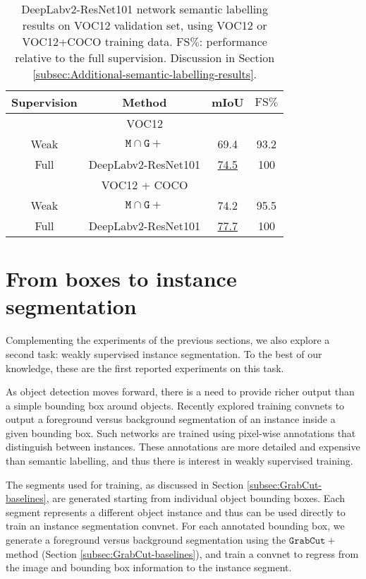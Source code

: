 \documentclass[10pt,english,british,twocolumn]{article}
\providecommand{\tabularnewline}{\\}
\begin{document}
\begin{table}
\begin{centering}
\begin{tabular}{c|c|cc}
Supervision & Method & mIoU & $\text{FS}\%$\tabularnewline
\hline 
\hline 
\multicolumn{4}{c}{\cellcolor{verylightgray}VOC12}\tabularnewline
\multirow{1}{*}{Weak} & $\mathtt{M}\cap\mathtt{G+}$ & 69.4 & 93.2\tabularnewline
Full & DeepLabv2-ResNet101 \cite{Chen2016ArxivDeeplabv2} & \uline{74.5} & 100\tabularnewline
\hline 
\hline 
\multicolumn{4}{c}{\cellcolor{verylightgray}VOC12 + COCO}\tabularnewline
\multirow{1}{*}{Weak} & $\mathtt{M}\cap\mathtt{G+}$ & 74.2 & 95.5\tabularnewline
\multirow{1}{*}{Full} & DeepLabv2-ResNet101 \cite{Chen2016ArxivDeeplabv2} & \uline{77.7} & 100\tabularnewline
\end{tabular}\vspace{-0.5em}
\par\end{centering}
\caption{\label{tab:Semantic-labelling-results-ResNet}Deep\-Lab\-v2-ResNet101
network semantic labelling results on VOC12 validation set, using
VOC12 or VOC12+COCO training data. $\text{FS}\%$: performance relative
to the full supervision. Discussion in Section \ref{subsec:Additional-semantic-labelling-results}.}

\vspace{-1em}
\end{table}


\section{\label{sec:Instance-segmentation}From boxes to instance segmentation}

Complementing the experiments of the previous sections, we also explore
a second task: weakly supervised instance segmentation. To the best
of our knowledge, these are the first reported experiments on this
task. 

As object detection moves forward, there is a need to provide richer
output than a simple bounding box around objects. Recently \cite{Hariharan2015Cvpr,Pinheiro2015Nips,Pinheiro2016Eccv}
explored training convnets to output a foreground versus background
segmentation of an instance inside a given bounding box. Such networks
are trained using pixel-wise annotations that distinguish between
instances. These annotations are more detailed and expensive than
semantic labelling, and thus there is interest in weakly supervised
training.

The segments used for training, as discussed in Section \ref{subsec:GrabCut-baselines},
are generated starting from individual object bounding boxes. Each
segment represents a different object instance and thus can be used
directly to train an instance segmentation convnet. For each annotated
bounding box, we generate a foreground versus background segmentation
using the $\mathtt{GrabCut+}$ method (Section \ref{subsec:GrabCut-baselines}),
and train a convnet to regress from the image and bounding box information
to the instance segment.
\end{document}
